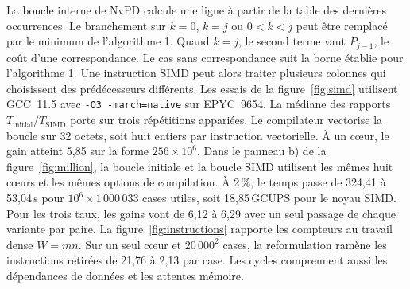 La boucle interne de NvPD calcule une ligne à partir de la table des dernières occurrences. Le branchement sur \(k=0\), \(k=j\) ou \(0<k<j\) peut être remplacé par le minimum de l'algorithme 1. Quand \(k=j\), le second terme vaut \(P_{j-1}\), le coût d'une correspondance. Le cas sans correspondance suit la borne établie pour l'algorithme 1. Une instruction SIMD peut alors traiter plusieurs colonnes qui choisissent des prédécesseurs différents.
Les essais de la figure~\ref{fig:simd} utilisent GCC~11.5 avec \texttt{-O3 -march=native} sur EPYC~9654. La médiane des rapports \(T_\mathrm{initial}/T_\mathrm{SIMD}\) porte sur trois répétitions appariées. Le compilateur vectorise la boucle sur 32 octets, soit huit entiers par instruction vectorielle. À un cœur, le gain atteint 5,85 sur la forme \(256\times10^6\). Dans le panneau b) de la figure~\ref{fig:million}, la boucle initiale et la boucle SIMD utilisent les mêmes huit cœurs et les mêmes options de compilation. À 2\,\%, le temps passe de 324,41 à 53,04\,s pour \(10^6\times1\,000\,033\) cases utiles, soit 18,85\,GCUPS pour le noyau SIMD. Pour les trois taux, les gains vont de 6,12 à 6,29 avec un seul passage de chaque variante par paire.
La figure~\ref{fig:instructions} rapporte les compteurs au travail dense \(W=mn\). Sur un seul cœur et \(20\,000^2\) cases, la reformulation ramène les instructions retirées de 21,76 à 2,13 par case. Les cycles comprennent aussi les dépendances de données et les attentes mémoire.


